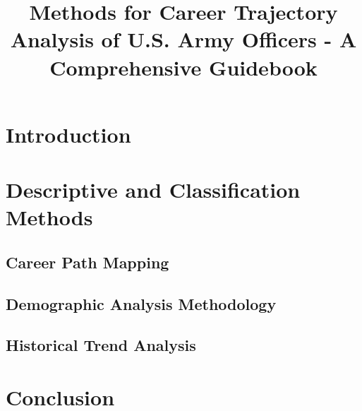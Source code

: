 \documentclass[12pt,a4paper]{article}
\title{Methods for Career Trajectory Analysis of U.S. Army Officers - A Comprehensive Guidebook}
\author{}
\date{}
\begin{document}
\maketitle

\tableofcontents

\newpage
\section{Introduction}


\newpage
\section{Descriptive and Classification Methods}


\subsection{Career Path Mapping}


\subsection{Demographic Analysis Methodology}


\subsection{Historical Trend Analysis}



\section{Conclusion}
\end{document}
